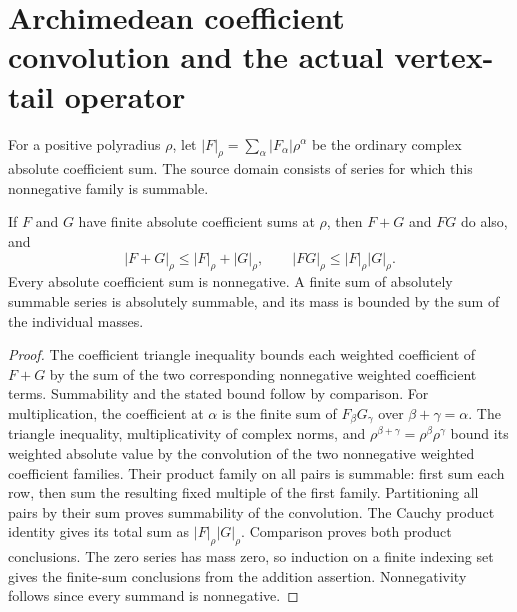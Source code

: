 \section{Archimedean coefficient convolution and the actual vertex-tail operator}
\label{sec:hironaka-actual-analytic-vertex-perturbation}
For a positive polyradius $\rho$, let $|F|_\rho=\sum_\alpha |F_\alpha|\rho^\alpha$ be the ordinary complex absolute coefficient sum. The source domain consists of series for which this nonnegative family is summable.

\begin{theorem}
\label{hir:actual-coefficient-mass-convolution}
\leanok
If $F$ and $G$ have finite absolute coefficient sums at $\rho$, then $F+G$ and $FG$ do also, and
\[
 |F+G|_\rho\le |F|_\rho+|G|_\rho,
 \qquad |FG|_\rho\le |F|_\rho|G|_\rho.
\]
Every absolute coefficient sum is nonnegative. A finite sum of absolutely summable series is absolutely summable, and its mass is bounded by the sum of the individual masses.
\end{theorem}
\begin{proof}
The coefficient triangle inequality bounds each weighted coefficient of $F+G$ by the sum of the two corresponding nonnegative weighted coefficient terms. Summability and the stated bound follow by comparison. For multiplication, the coefficient at $\alpha$ is the finite sum of $F_\beta G_\gamma$ over $\beta+\gamma=\alpha$. The triangle inequality, multiplicativity of complex norms, and $\rho^{\beta+\gamma}=\rho^\beta\rho^\gamma$ bound its weighted absolute value by the convolution of the two nonnegative weighted coefficient families. Their product family on all pairs is summable: first sum each row, then sum the resulting fixed multiple of the first family. Partitioning all pairs by their sum proves summability of the convolution. The Cauchy product identity gives its total sum as $|F|_\rho|G|_\rho$. Comparison proves both product conclusions. The zero series has mass zero, so induction on a finite indexing set gives the finite-sum conclusions from the addition assertion. Nonnegativity follows since every summand is nonnegative.
\end{proof}

